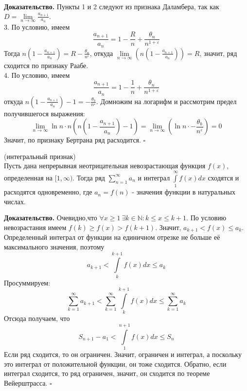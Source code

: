 \textbf{Доказательство.} Пункты 1 и 2 следуют из признака Даламбера,
так как $D=\lim\limits_{n \to \infty}\frac{a_{n+1}}{a_n}$.\\
3. По условию, имеем
$$\frac{a_{n+1}}{a_n}=1-\frac{R}{n}+\frac{\theta_n}{n^{1+\varepsilon}}$$
Тогда $n(1-\frac{a_{n+1}}{a_n})=R-\frac{\theta_n}{n^\varepsilon}$, откуда
$\lim\limits_{n \to \infty}\left(n\left(1-\frac{a_{n+1}}{a_n}\right)\right)=R$,
значит, ряд сходится по признаку Раабе.\\
4. По условию, имеем
$$\frac{a_{n+1}}{a_n}=1-\frac{1}{n}+\frac{\theta_n}{n^{1+\varepsilon}}$$
откуда $n\left( 1-\frac{a_{n+1}}{a_n}\right)-1=
-\frac{\theta_b}{n^\varepsilon}$. Домножим на логарифм и рассмотрим предел
получившегося выражения:
$$\lim\limits_{n \to \infty}
\ln n\cdot n\left(n\left(1-\frac{a_{n+1}}{a_n}\right)-1\right)=
\lim\limits_{n \to \infty}\left(\ln n\cdot 
-\frac{\theta_b}{n^\varepsilon}\right)=0$$
Значит, по признаку Бертрана ряд расходится. $\square$ 
\begin{theor}
    (интегральный признак)\\
    Пусть дана непрерывная неотрицательная невозрастающая функция $f(x)$,
    определенная на $[1,\infty)$. Тогда 
    ряд $\sum\limits_{n=1}^{\infty} a_n$ и интеграл $\int\limits^\infty_1
    f(x)dx$ сходятся и расходятся одновременно, где $a_n=f(n)$ - значения
    функции в натуральных числах.
\end{theor}
\textbf{Доказательство.} Очевидно,что
$\forall x\geqslant1~\exists k\in\mathbb{N}:k\leqslant x\leqslant k+1$.
По условию невозрастания имеем $f(k)\geqslant f(x)>f(k+1)$.
Значит, $a_{k+1}<f(x)\leqslant a_k$. Определенный интеграл от функции 
на единичном отрезке не больше её максимального значения, поэтому
$$a_{k+1}<\int\limits_{k}^{k+1}f(x)dx\leqslant a_k$$ 
Просуммируем: 
$$\sum\limits_{k=1}^{\infty}a_{k+1}<\sum\limits_{k=1}^{\infty}
\int\limits_{k}^{k+1}f(x)dx \leqslant \sum\limits_{k=1}^{\infty} a_k$$
Отсюда получаем, что 
$$S_{n+1}-a_1<\int\limits_{1}^{n+1}f(x)dx\leqslant S_n$$ 
Если ряд сходится, то он ограничен. Значит, ограничен и интеграл, а поскольку
это интеграл от положительной функции, он тоже сходится. Обратно, если 
интеграл сходится, то ряд ограничен, значит, он сходится по теореме 
Вейерштрасса. $\square$


